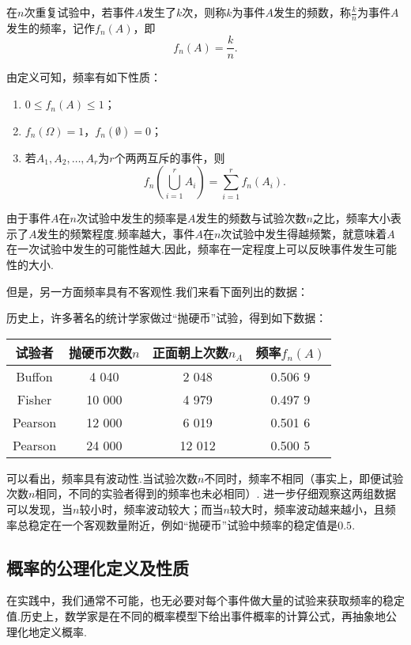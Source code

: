 \begin{definition}
在\(n\)次重复试验中，若事件\(A\)发生了\(k\)次，则称\(k\)为事件\(A\)发生的频数，称\(\frac{k}{n}\)为事件\(A\)发生的频率，记作\(f_n(A)\)，即\[
f_n(A) = \frac{k}{n}.
\]
\end{definition}

\begin{property}
由定义可知，频率有如下性质：\begin{enumerate}
\item \(0 \leq f_n(A) \leq 1\)；
\item \(f_n(\Omega) = 1\)，\(f_n(\emptyset) = 0\)；
\item 若\(A_1,A_2,\dotsc,A_r\)为\(r\)个两两互斥的事件，则\[
f_n\left( \bigcup_{i=1}^r A_i \right)
= \sum\limits_{i=1}^r f_n(A_i).
\]
\end{enumerate}
\end{property}

由于事件\(A\)在\(n\)次试验中发生的频率是\(A\)发生的频数与试验次数\(n\)之比，频率大小表示了\(A\)发生的频繁程度.频率越大，事件\(A\)在\(n\)次试验中发生得越频繁，就意味着\(A\)在一次试验中发生的可能性越大.因此，频率在一定程度上可以反映事件发生可能性的大小.

但是，另一方面频率具有不客观性.我们来看下面列出的数据：
\begin{example}
历史上，许多著名的统计学家做过“抛硬币”试验，得到如下数据：
\begin{center}
\begin{tabular}{c|c|c|c}
\hline
试验者 & 抛硬币次数\(n\) & 正面朝上次数\(n_A\) & 频率\(f_n(A)\) \\ \hline
Buffon & 4 040 & 2 048 & 0.506 9 \\
Fisher & 10 000 & 4 979 & 0.497 9 \\
Pearson & 12 000 & 6 019 & 0.501 6 \\
Pearson & 24 000 & 12 012 & 0.500 5 \\ \hline
\end{tabular}
\end{center}
\end{example}
可以看出，频率具有波动性.当试验次数\(n\)不同时，频率不相同（事实上，即便试验次数\(n\)相同，不同的实验者得到的频率也未必相同）.
进一步仔细观察这两组数据可以发现，当\(n\)较小时，频率波动较大；而当\(n\)较大时，频率波动越来越小，且频率总稳定在一个客观数量附近，例如“抛硬币”试验中频率的稳定值是\(0.5\).

\subsection{概率的公理化定义及性质}
在实践中，我们通常不可能，也无必要对每个事件做大量的试验来获取频率的稳定值.历史上，数学家是在不同的概率模型下给出事件概率的计算公式，再抽象地公理化地定义概率.

